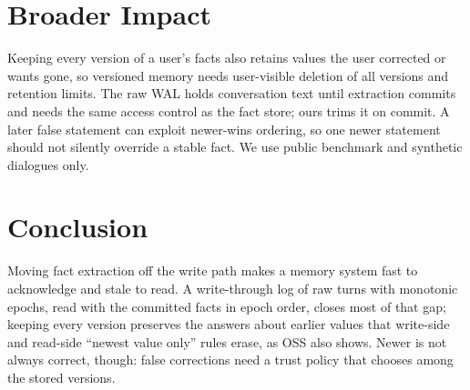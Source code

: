 \section{Broader Impact}
\label{sec:impact}

Keeping every version of a user's facts also retains values the user corrected or wants gone, so versioned memory needs user-visible deletion of all versions and retention limits. The raw WAL holds conversation text until extraction commits and needs the same access control as the fact store; ours trims it on commit. A later false statement can exploit newer-wins ordering, so one newer statement should not silently override a stable fact. We use public benchmark and synthetic dialogues only.

\section{Conclusion}
\label{sec:conclusion}

Moving fact extraction off the write path makes a memory system fast to acknowledge and stale to read. A write-through log of raw turns with monotonic epochs, read with the committed facts in epoch order, closes most of that gap; keeping every version preserves the answers about earlier values that write-side and read-side ``newest value only'' rules erase, as \memzero{} OSS also shows. Newer is not always correct, though: false corrections need a trust policy that chooses among the stored versions.
